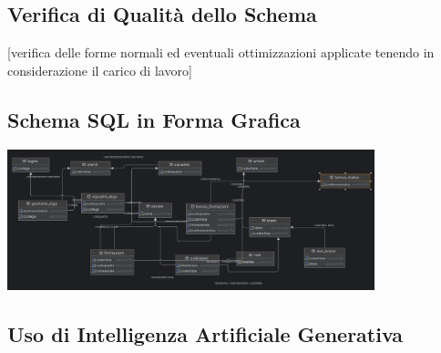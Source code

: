 \documentclass[a4paper,12pt]{article}
\begin{document}
\subsection{Verifica di Qualità dello Schema}
[verifica delle forme normali ed eventuali ottimizzazioni applicate tenendo in considerazione il carico di lavoro]

\subsection{Schema SQL in Forma Grafica}
\begin{center}
	\includegraphics[width=0.8\textwidth]{project_bd.png}
\end{center}



\subsection{Uso di Intelligenza Artificiale Generativa}
\end{document}
